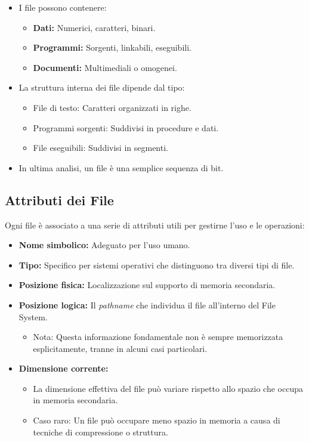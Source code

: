 \begin{itemize}
    \item I file possono contenere:
    \begin{itemize}
        \item \textbf{Dati:} Numerici, caratteri, binari.
        \item \textbf{Programmi:} Sorgenti, linkabili, eseguibili.
        \item \textbf{Documenti:} Multimediali o omogenei.
    \end{itemize}
    \item La struttura interna dei file dipende dal tipo:
    \begin{itemize}
        \item File di testo: Caratteri organizzati in righe.
        \item Programmi sorgenti: Suddivisi in procedure e dati.
        \item File eseguibili: Suddivisi in segmenti.
    \end{itemize}
    \item In ultima analisi, un file è una semplice sequenza di bit.
\end{itemize}

\subsection{Attributi dei File}

Ogni file è associato a una serie di attributi utili per gestirne l'uso e le operazioni:

\begin{itemize}
    \item \textbf{Nome simbolico:} Adeguato per l'uso umano.
    \item \textbf{Tipo:} Specifico per sistemi operativi che distinguono tra diversi tipi di file.
    \item \textbf{Posizione fisica:} Localizzazione sul supporto di memoria secondaria.
    \item \textbf{Posizione logica:} Il \textit{pathname} che individua il file all'interno del File System.
    \begin{itemize}
        \item Nota: Questa informazione fondamentale non è sempre memorizzata esplicitamente, tranne in alcuni casi particolari.
    \end{itemize}
    \item \textbf{Dimensione corrente:} 
    \begin{itemize}
        \item La dimensione effettiva del file può variare rispetto allo spazio che occupa in memoria secondaria.
        \item Caso raro: Un file può occupare meno spazio in memoria a causa di tecniche di compressione o struttura.
    \end{itemize}
\end{itemize}

